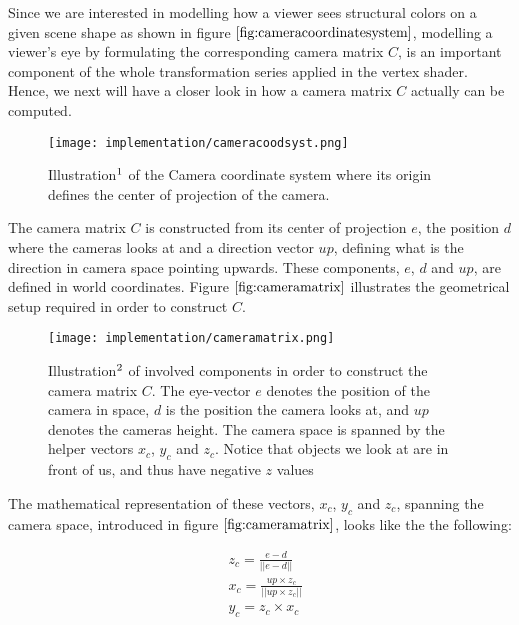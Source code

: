 Since we are interested in modelling how a viewer sees structural colors on a given scene shape as shown in figure $\ref{fig:cameracoordinatesystem}$, modelling a viewer's eye by formulating the corresponding camera matrix $C$, is an important component of the whole transformation series applied in the vertex shader. Hence, we next will have a closer look in how a camera matrix $C$ actually can be computed. 

\begin{figure}[H]
  \centering
  \texttt{[image: implementation/cameracoodsyst.png]}
  \caption[Camera Coordinate System]{Illustration$\footnotemark$ of the Camera coordinate system where its origin defines the center of projection of the camera.}
  \label{fig:cameracoordinatesystem}
\end{figure}

The camera matrix $C$ is constructed from its center of projection $e$, the position $d$ where the cameras looks at and a direction vector $up$, defining what is the direction in camera space pointing upwards. These components, $e$, $d$ and $up$, are defined in world coordinates. Figure $\ref{fig:cameramatrix}$ illustrates the geometrical setup required in order to construct $C$.

\begin{figure}[H]
  \centering
  \texttt{[image: implementation/cameramatrix.png]}
  \caption[Camera Matrix]{Illustration$\footnotemark$ of involved components in order to construct the camera matrix $C$. The eye-vector $e$ denotes the position of the camera in space, $d$ is the position the camera looks at, and $up$ denotes the cameras height. The camera space is spanned by the helper vectors $x_c$, $y_c$ and $z_c$. Notice that objects we look at are in front of us, and thus have negative $z$ values}
  \label{fig:cameramatrix}
\end{figure}

The mathematical representation of these vectors, $x_c$, $y_c$ and $z_c$, spanning the camera space, introduced in figure $\ref{fig:cameramatrix}$, looks like the the following: 

\begin{align}
  &z_c = \frac{e-d}{||e-d||} \nonumber \\
  &x_c = \frac{up \times z_c}{||up \times z_c||} \nonumber \\
  &y_c = z_c \times x_c
  \label{eq:cameraspacespanningvectors}
\end{align}

